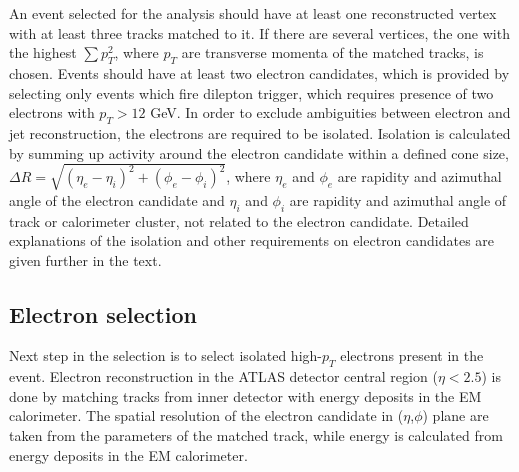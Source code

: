 An event selected for the analysis should have at least one reconstructed vertex with at least three tracks matched to it. 
If there are several vertices, the one with the highest
$\sum p^2_T$, where $p_T$ are transverse momenta of the matched tracks, is chosen.
Events should have at least two electron candidates, which is provided by selecting only events
which fire dilepton trigger, which requires presence of two electrons with $p_T > 12$ GeV.
In order to exclude ambiguities between electron and jet reconstruction, the electrons are required to
be isolated. Isolation is calculated by summing up activity around the electron candidate within a defined cone size, 
$\Delta R = \sqrt{ (\eta_e-\eta_i)^2 + (\phi_e-\phi_i)^2 }$,
where $\eta_e$ and $\phi_e$ are rapidity and azimuthal angle of the electron candidate and $\eta_i$ and $\phi_i$ are rapidity and azimuthal angle of track or calorimeter cluster, not related to the electron candidate. Detailed explanations of the isolation and other requirements on electron candidates are given further in the text.

\subsection{Electron selection}
\label{subsec:electron_selection}
Next step in the selection is to select isolated high-$p_T$ electrons present in the event.
Electron reconstruction in the ATLAS detector central region ($\eta<2.5$) is done by matching tracks from inner detector with energy deposits in the EM calorimeter.
The spatial resolution of the electron candidate in ($\eta$,$\phi$) plane are taken from the parameters of the matched track,
while energy is calculated from energy deposits in the EM calorimeter.




